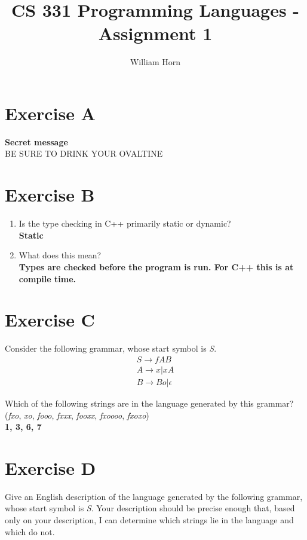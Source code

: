 \documentclass{article}
\author{William Horn}
\title{CS 331 Programming Languages - Assignment 1}
\begin{document}
\maketitle

\section*{Exercise A}
\textbf{Secret message} \\

BE SURE TO DRINK YOUR OVALTINE

\section*{Exercise B}
\flushleft
\begin{enumerate}
    \item Is the type checking in C++ primarily static or dynamic?\\
    \vspace{1mm}
    \textbf{Static}

    \item What does this mean?\\
    \vspace{1mm}
    \textbf{Types are checked before the program is run. For C++ this is at compile time.}
\end{enumerate}

\section*{Exercise C}
Consider the following grammar, whose start symbol is \emph{S}.
\begin{align}
S \rightarrow fAB \\
A \rightarrow x | xA \\
B \rightarrow Bo | \epsilon
\end{align}

Which of the following strings are in the language generated by this grammar?  (\emph{fxo}, \emph{xo}, \emph{fooo}, \emph{fxxx}, \emph{fooxx}, \emph{fxoooo}, \emph{fxoxo}) \\
\vspace{1mm}
\textbf{1, 3, 6, 7}
\newpage

\section*{Exercise D}
Give an English description of the language generated by the following grammar, whose start symbol is \emph{S}. Your description should be precise enough that, based only on your description, I can determine which strings lie in the language and which do not.
\end{document}
